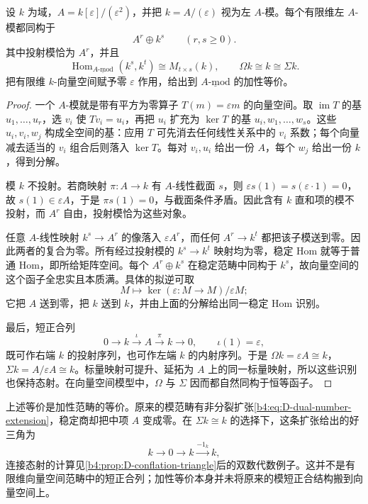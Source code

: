 \begin{proposition}\label{b4:prop:D-dual-number-stable}
	设 \(k\) 为域，\(A=k[\varepsilon]/(\varepsilon^2)\)，并把 \(k=A/(\varepsilon)\) 视为左 \(A\)-模。每个有限维左 \(A\)-模都同构于
	\[
		A^r\oplus k^s\qquad(r,s\ge0).
	\]
	其中投射模恰为 \(A^r\)，并且
	\[
		\operatorname{Hom}_{\underline{A\text{-}\mathrm{mod}}}(k^s,k^t) \cong M_{t\times s}(k), \qquad \Omega k\cong k\cong\Sigma k.
	\]
	把有限维 \(k\)-向量空间赋予零 \(\varepsilon\) 作用，给出到 \(\underline{A\text{-}\mathrm{mod}}\) 的加性等价。
\end{proposition}
\begin{proof}
	一个 \(A\)-模就是带有平方为零算子 \(T(m)=\varepsilon m\) 的向量空间。取 \(\operatorname{im}T\) 的基 \(u_1,\ldots,u_r\)，选 \(v_i\) 使 \(Tv_i=u_i\)，再把 \(u_i\) 扩充为 \(\ker T\) 的基 \(u_i,w_1,\ldots,w_s\)。这些 \(u_i,v_i,w_j\) 构成全空间的基：应用 \(T\) 可先消去任何线性关系中的 \(v_i\) 系数；每个向量减去适当的 \(v_i\) 组合后则落入 \(\ker T\)。每对 \(v_i,u_i\) 给出一份 \(A\)，每个 \(w_j\) 给出一份 \(k\)，得到分解。

	模 \(k\) 不投射。若商映射 \(\pi:A\to k\) 有 \(A\)-线性截面 \(s\)，则 \(\varepsilon s(1)=s(\varepsilon\cdot1)=0\)，故 \(s(1)\in\varepsilon A\)，于是 \(\pi s(1)=0\)，与截面条件矛盾。因此含有 \(k\) 直和项的模不投射，而 \(A^r\) 自由，投射模恰为这些对象。

	任意 \(A\)-线性映射 \(k^s\to A^r\) 的像落入 \(\varepsilon A^r\)，而任何 \(A^r\to k^t\) 都把该子模送到零。因此两者的复合为零。所有经过投射模的 \(k^s\to k^t\) 映射均为零，稳定 Hom 就等于普通 Hom，即所给矩阵空间。每个 \(A^r\oplus k^s\) 在稳定范畴中同构于 \(k^s\)，故向量空间的这个函子全忠实且本质满。具体的拟逆可取
	\[
		M\longmapsto\ker(\varepsilon:M\to M)/\varepsilon M;
	\]
	它把 \(A\) 送到零，把 \(k\) 送到 \(k\)，并由上面的分解给出同一稳定 Hom 识别。

	最后，短正合列
	\begin{equation}\label{b4:eq:D-dual-number-extension}
		0\longrightarrow k\xrightarrow{\iota}A\xrightarrow{\pi}k\longrightarrow0, \qquad \iota(1)=\varepsilon,
	\end{equation}
	既可作右端 \(k\) 的投射序列，也可作左端 \(k\) 的内射序列。于是 \(\Omega k=\varepsilon A\cong k\)，\(\Sigma k=A/\varepsilon A\cong k\)。标量映射可提升、延拓为 \(A\) 上的同一标量映射，所以这些识别也保持态射。在向量空间模型中，\(\Omega\) 与 \(\Sigma\) 因而都自然同构于恒等函子。
\end{proof}

上述等价是加性范畴的等价。原来的模范畴有非分裂扩张\eqref{b4:eq:D-dual-number-extension}，稳定商却把中项 \(A\) 变成零。在 \(\Sigma k\cong k\) 的选择下，这条扩张给出的好三角为
\[
	k\longrightarrow0\longrightarrow k\xrightarrow{-1_k}k,
\]
连接态射的计算见\cref{b4:prop:D-conflation-triangle}后的双数代数例子。这并不是有限维向量空间范畴中的短正合列；加性等价本身并未将原来的模短正合结构搬到向量空间上。

